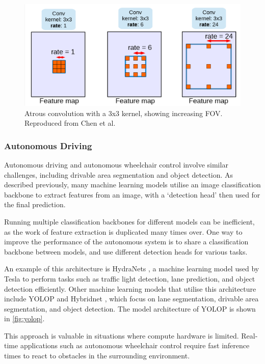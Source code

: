 \begin{figure}[H]
    \centering
    \includegraphics[width=0.6\linewidth]{images/atrous_convolution.png}
    \caption{Atrous convolution with a 3x3 kernel, showing increasing FOV. Reproduced from Chen et al. \cite{chenRethinkingAtrousConvolution2017}}
    \label{fig:atrous_convolution}
\end{figure}

\subsubsection{Autonomous Driving}
Autonomous driving and autonomous wheelchair control involve similar challenges,
including drivable area segmentation and object detection. As described previously, many machine learning
models utilise an image classification backbone to extract features from an image, with a `detection head'
then used for the final prediction.

Running multiple classification backbones for different models can be inefficient, as
the work of feature extraction is duplicated many times over. One way to improve the performance
of the autonomous system is to share a classification backbone between models, and use different detection
heads for various tasks.

An example of this architecture is HydraNets \cite{karpathyTeslaAIDay2021}, a machine learning model used by
Tesla to perform tasks such as traffic light detection, lane prediction, and object detection efficiently.
Other machine learning models that utilise this architecture include YOLOP \cite{wuYOLOPYouOnly2021} and
Hybridnet \cite{vuHybridNetsEndtoEndPerception2022}, which focus on lane segmentation, drivable area segmentation,
and object detection. The model architecture of YOLOP is shown in \cref{fig:yolop}.

This approach is valuable in situations where compute hardware is limited. Real-time applications such as
autonomous wheelchair control require fast inference times to react to obstacles in the surrounding environment.

